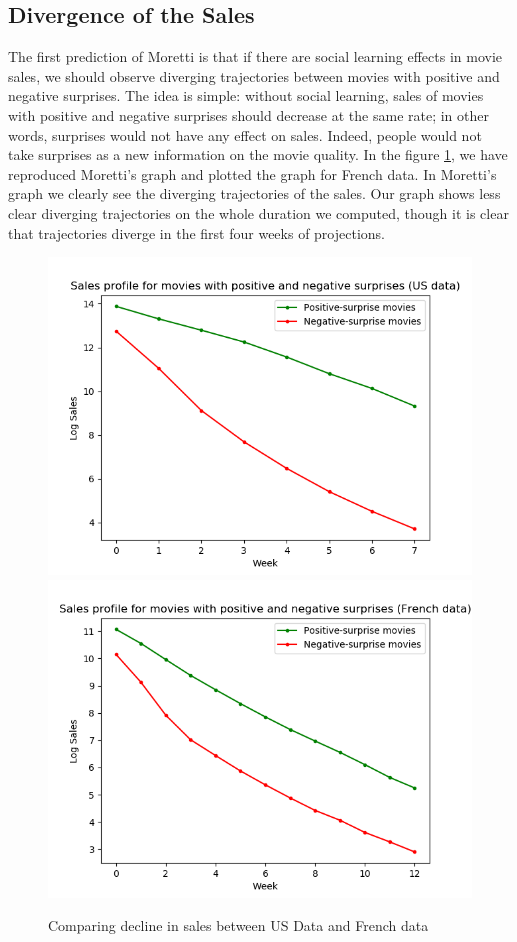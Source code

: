 \subsection{Divergence of the Sales}\label{subsec2.2}


The first prediction of Moretti is that if there are social learning effects in movie sales, we should observe diverging trajectories between movies with positive and negative surprises. The idea is simple: without social learning, sales of movies with positive and negative surprises should decrease at the same rate; in other words, surprises would not have any effect on sales. Indeed, people would not take surprises as a new information on the movie quality. In the figure \ref{part2.1_plot_moretti}, we have reproduced Moretti's graph and plotted the graph for French data. In Moretti's graph we clearly see the diverging trajectories of the sales. Our graph shows less clear diverging trajectories on the whole duration we computed, though it is clear that trajectories diverge in the first four weeks of projections.
\begin{figure}[!htbp]\centering
	\caption{Comparing decline in sales between US Data and French data}
	\label{part2.1_plot_moretti}
	\includegraphics[scale=0.5]{sales_us.png}
	\includegraphics[scale=0.5]{sales_french.png}
\end{figure}
